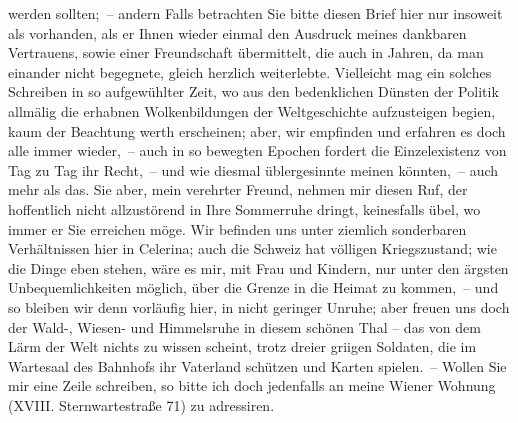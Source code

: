 \begin{ledgroupsized}[t]{13cm}
                    werden sollten; – andern Falls betrachten Sie bitte diesen Brief hier nur
                    insoweit als vorhanden, als er Ihnen wieder einmal den Ausdruck meines dankbaren
                    Vertrauens, sowie einer Freundschaft übermittelt, die auch in  Jahren, da man einander nicht begegnete,
                    gleich herzlich weiterlebte.\pend
           \pstart
           Vielleicht mag ein solches Schreiben in so aufgewühlter Zeit, wo aus den
                    bedenklichen Dünsten der Politik allmälig die erhabnen Wolkenbildun{\pb}gen der Weltgeschichte aufzusteigen begi{\geminationn}en, kaum der Beachtung werth erscheinen; aber,
                    wir empfinden und erfahren es doch alle immer wieder, – auch in so bewegten
                    Epochen fordert die Einzelexistenz von Tag zu Tag ihr Recht, – und wie diesmal
                    üblergesinnte meinen könnten, – auch mehr als das. Sie aber, mein verehrter
                    Freund, nehmen mir diesen Ruf, der hoffentlich nicht allzustörend in Ihre
                    Sommerruhe dringt, keinesfalls übel, wo immer er Sie erreichen möge.\pend
           \pstart
           Wir befinden uns unter ziemlich sonderbaren Verhältnissen hier in Celerina; auch die Schweiz hat völligen Kriegszustand; wie die Dinge eben
                    stehen, wäre es mir, mit Frau und Kindern, nur unter den ärgsten {\pb}Unbequemlichkeiten möglich, über die Grenze in die Heimat zu kommen, – und so
                    bleiben wir denn vorläufig \introOben{}hier\introOben{}, in nicht geringer
                    Unruhe; aber freuen uns doch der Wald-, Wiesen- und Himmelsruhe in diesem
                    schönen Thal – das von dem Lärm der Welt nichts zu wissen scheint, trotz dreier
                        gri{\geminationm}igen Soldaten, die im Wartesaal des
                    Bahnhofs ihr Vaterland schützen und Karten spielen. –\pend
           \pstart
           Wollen Sie mir eine Zeile schreiben, so bitte ich doch jedenfalls an meine Wiener Wohnung (XVIII. Sternwartestraße 71) zu adressiren.\pend

\end{ledgroupsized}
